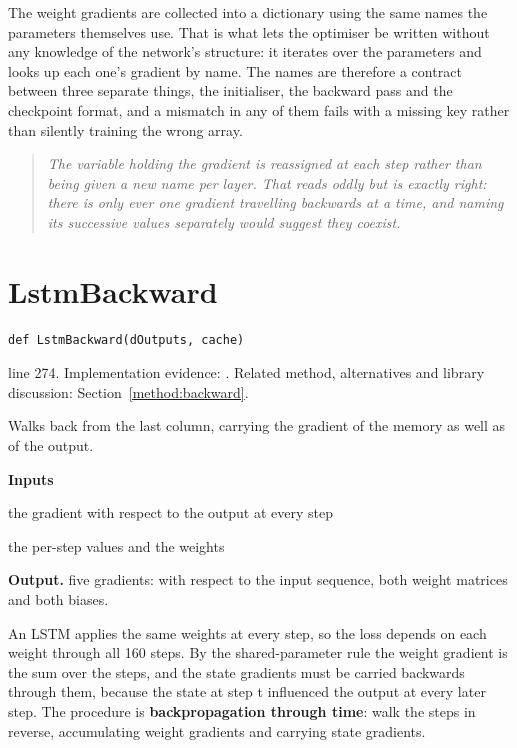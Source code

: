 The weight gradients are collected into a dictionary using the same names the parameters themselves use. That is what lets the optimiser be written without any knowledge of the network's structure: it iterates over the parameters and looks up each one's gradient by name. The names are therefore a contract between three separate things, the initialiser, the backward pass and the checkpoint format, and a mismatch in any of them fails with a missing key rather than silently training the wrong array.


\begin{quote}\small\itshape The variable holding the gradient is reassigned at each step rather than being given a new name per layer. That reads oddly but is exactly right: there is only ever one gradient travelling backwards at a time, and naming its successive values separately would suggest they coexist.\end{quote}


\section{LstmBackward}\label{fn:train:LstmBackward}
\begin{lstlisting}[style=sig]
def LstmBackward(dOutputs, cache)
\end{lstlisting}
 line 274. Implementation evidence: \cite{code2026}. Related method, alternatives and library discussion: Section~\ref{method:backward}.


Walks back from the last column, carrying the gradient of the memory as well as of the output.




\noindent\textbf{Inputs}
\begin{description}[leftmargin=2.2em,style=nextline,font=\normalfont\ttfamily]\setlength\itemsep{1pt}
  \item[{dOutputs}] \normalfont the gradient with respect to the output at every step
  \item[{cache}] \normalfont the per-step values and the weights
\end{description}

\noindent\textbf{Output.} five gradients: with respect to the input sequence, both weight matrices and both biases.


An LSTM applies the same weights at every step, so the loss depends on each weight through all 160 steps. By the shared-parameter rule the weight gradient is the sum over the steps, and the state gradients must be carried backwards through them, because the state at step t influenced the output at every later step. The procedure is \textbf{backpropagation through time}: walk the steps in reverse, accumulating weight gradients and carrying state gradients.


